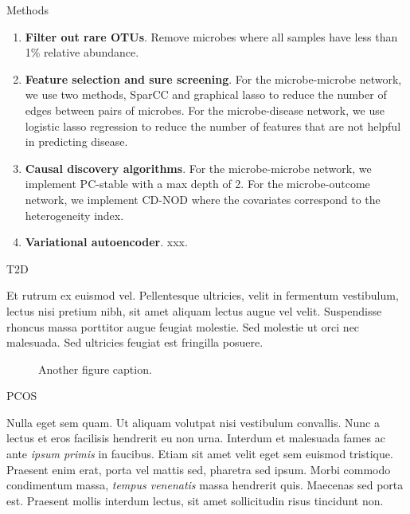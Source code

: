 \documentclass[final]{beamer}
\newlength{\colwidth}
\begin{document}
\begin{frame}[t]
\begin{columns}[t]
\begin{column}{\colwidth}
\begin{block}{Methods}
    \begin{enumerate}
      \item \textbf{Filter out rare OTUs}. Remove microbes where all samples have less than 1\%
      relative abundance. 
      \item \textbf{Feature selection and sure screening}. For the microbe-microbe network, we use two 
      methods, SparCC and graphical lasso to reduce the number of edges between pairs of microbes.
      For the microbe-disease network, we use logistic lasso regression to reduce the number of 
      features that are not helpful in predicting disease. 
      \item \textbf{Causal discovery algorithms}. For the microbe-microbe network, we implement
      PC-stable with a max depth of 2. For the microbe-outcome network, we implement CD-NOD
      where the covariates correspond to the heterogeneity index. 
      \item \textbf{Variational autoencoder}. xxx. 
    \end{enumerate}

  \end{block}

  \begin{block}{T2D}

    Et rutrum ex euismod vel. Pellentesque ultricies, velit in fermentum
    vestibulum, lectus nisi pretium nibh, sit amet aliquam lectus augue vel
    velit. Suspendisse rhoncus massa porttitor augue feugiat molestie. Sed
    molestie ut orci nec malesuada. Sed ultricies feugiat est fringilla
    posuere.

    \begin{figure}
      \centering
      \caption{Another figure caption.}
    \end{figure}

  \end{block}

  \begin{block}{PCOS}

    Nulla eget sem quam. Ut aliquam volutpat nisi vestibulum convallis. Nunc a
    lectus et eros facilisis hendrerit eu non urna. Interdum et malesuada fames
    ac ante \textit{ipsum primis} in faucibus. Etiam sit amet velit eget sem
    euismod tristique. Praesent enim erat, porta vel mattis sed, pharetra sed
    ipsum. Morbi commodo condimentum massa, \textit{tempus venenatis} massa
    hendrerit quis. Maecenas sed porta est. Praesent mollis interdum lectus,
    sit amet sollicitudin risus tincidunt non.


\end{block}
\end{column}
\end{columns}
\end{frame}
\end{document}
